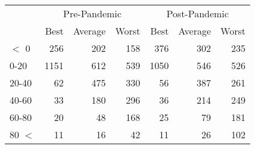
\begin{tabular}[t]{lrrrrrr}
\toprule
\multicolumn{1}{c}{ } & \multicolumn{3}{c}{Pre-Pandemic} & \multicolumn{3}{c}{Post-Pandemic} \\
\cmidrule(l{3pt}r{3pt}){2-4} \cmidrule(l{3pt}r{3pt}){5-7}
 & Best & Average & Worst & Best & Average & Worst\\
\midrule
$<$ 0 & 256 & 202 & 158 & 376 & 302 & 235\\
0-20 & 1151 & 612 & 539 & 1050 & 546 & 526\\
20-40 & 62 & 475 & 330 & 56 & 387 & 261\\
40-60 & 33 & 180 & 296 & 36 & 214 & 249\\
60-80 & 20 & 48 & 168 & 25 & 79 & 181\\
80 $<$ & 11 & 16 & 42 & 11 & 26 & 102\\
\bottomrule
\end{tabular}
